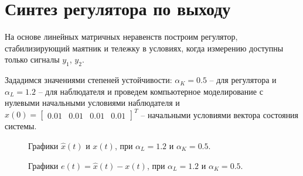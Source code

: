 \section{Синтез регулятора по выходу}

На основе линейных матричных неравенств построим регулятор, стабилизирующий маятник и тележку в условиях, когда измерению доступны только сигналы $y_1$, $y_2$.

Зададимся значениями степеней устойчивости: $\alpha_K = 0.5$ -- для регулятора и $\alpha_L=1.2$ -- для наблюдателя и проведем компьютерное моделирование с нулевыми начальными условиями наблюдателя и $x(0) = \begin{bmatrix}
    0.01 & 0.01 & 0.01 & 0.01
\end{bmatrix}^T$ -- начальными условиями вектора состояния системы.


\begin{figure}[!h]
\caption{Графики $\hat{x}(t)$ и $x(t)$, при $\alpha_L = 1.2$ и $\alpha_K = 0.5$.}
\label{4_6_1.20.5x}
\end{figure}

\begin{figure}[!h]
\caption{Графики $e(t) = \hat{x}(t)-x(t)$, при $\alpha_L = 1.2$ и $\alpha_K = 0.5$.}
\label{4_6_1.20.5e}
\end{figure}







